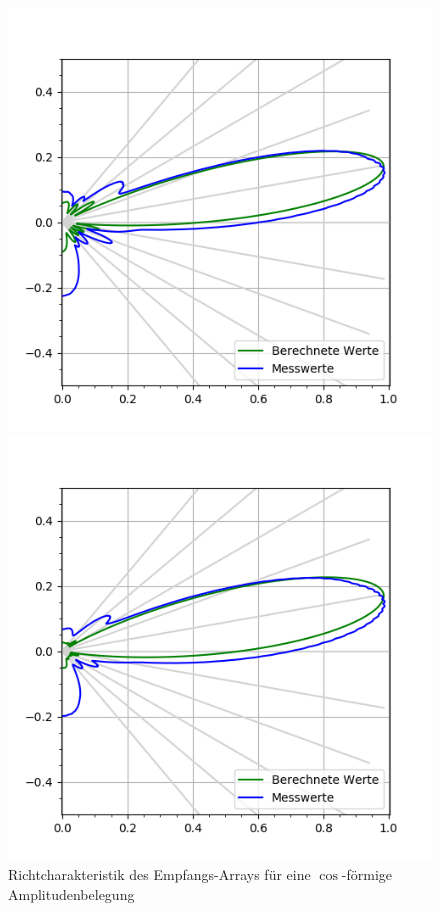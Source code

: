 \begin{figure}[htb]
\begin{minipage}{0.5\textwidth}
\includegraphics[width=\textwidth]{graphics/plot_test_characteristic_receiver_10_deg_send_rect_receive_cos_4_bursts.png}
\caption{Richtcharakteristik des Empfangs-Arrays für eine $\cos$-förmige Amplitudenbelegung} %
\label{fig:plot_test_characteristic_receiver_10_deg_send_rect_receive_cos_4_bursts}
%
\end{minipage}
\begin{minipage}{0.5\textwidth}
\includegraphics[width=\textwidth]{graphics/plot_test_characteristic_receiver_10_deg_send_rect_receive_cos2_4_bursts.png}

\end{minipage}
\end{figure}
